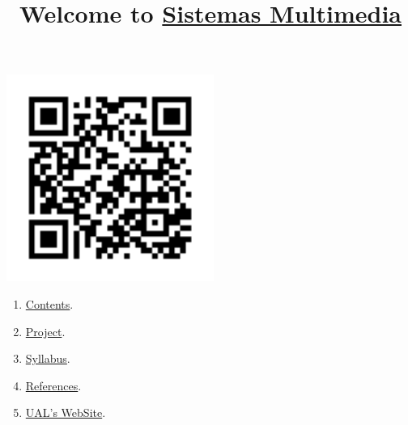 
%
\title{Welcome to \href{https://www.ual.es/estudios/masteres/presentacion/plandeestudios/asignatura/7114/71142105}{Sistemas Multimedia}}

\maketitle

\begin{center}
  \includegraphics[width=256px]{SM_codigo_QR.png}
\end{center}

\begin{enumerate}
\item \href{https://sistemas-multimedia.github.io/contents}{Contents}.
\item \href{https://github.com/Sistemas-Multimedia/VCF}{Project}.
\item \href{https://sistemas-multimedia.github.io/syllabus}{Syllabus}.
\item \href{https://sistemas-multimedia.github.io/references}{References}.
\item \href{https://www.ual.es/estudios/masteres/presentacion/plandeestudios/asignatura/7114/71142105}{UAL's WebSite}.
\end{enumerate}
